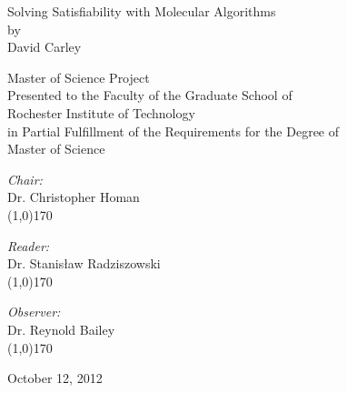 \begin{titlepage}

	\begin{center}
	
		{\LARGE Solving {\sc Satisfiability} with Molecular Algorithms}\\[1.5cm]
		by\\
		\vspace{0.5cm}
		{\large David Carley}\\

		\vspace{1cm}
		
{\large Master of Science Project}\\
				\vspace{0.5cm}
Presented to the Faculty of the Graduate School of\\
		\vspace{0.5cm}				
Rochester Institute of Technology\\
		\vspace{0.5cm}
in Partial Fulfillment of the Requirements for the Degree of\\
		\vspace{0.5cm}
{\large Master of Science}
		
		\vspace{1cm}
		
		\begin{minipage}{0.4\textwidth}
			\begin{flushleft} \large

			\end{flushleft}
			\end{minipage}
			\begin{minipage}{0.4\textwidth}
			\begin{flushleft} \large

				\emph{Chair:} \\
				Dr. Christopher Homan
				\vspace{1cm}\\
				\line(1,0){170}\\
				\vspace{0.2cm}

				\emph{Reader:} \\
				Dr. Stanis\l aw Radziszowski
				\vspace{1cm}\\
				\line(1,0){170}\\
				\vspace{0.2cm}
				
				\emph{Observer:} \\
				Dr. Reynold Bailey
				\vspace{1cm}\\
				\line(1,0){170}
				
			\end{flushleft}
		\end{minipage}
	
		\vfill
		
		{\large October 12, 2012}
	
	\end{center}

\end{titlepage}